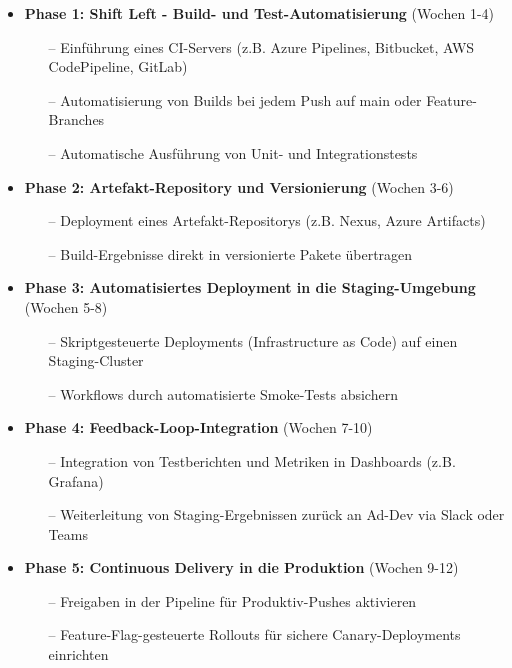 \begin{itemize}
    \item \textbf{Phase 1: Shift Left - Build- und Test-Automatisierung} (Wochen 1-4)
    \begin{itemize}
        \item[--] Einführung eines CI-Servers (z.B. Azure Pipelines, Bitbucket, AWS CodePipeline, GitLab)
        \item[--] Automatisierung von Builds bei jedem Push auf main oder Feature-Branches
        \item[--] Automatische Ausführung von Unit- und Integrationstests
    \end{itemize}

    \item \textbf{Phase 2: Artefakt-Repository und Versionierung} (Wochen 3-6)
    \begin{itemize}
        \item[--] Deployment eines Artefakt-Repositorys (z.B. Nexus, Azure Artifacts)
        \item[--] Build-Ergebnisse direkt in versionierte Pakete übertragen
    \end{itemize}

    \item \textbf{Phase 3: Automatisiertes Deployment in die Staging-Umgebung} (Wochen 5-8)
    \begin{itemize}
        \item[--] Skriptgesteuerte Deployments (Infrastructure as Code) auf einen Staging-Cluster
        \item[--] Workflows durch automatisierte Smoke-Tests absichern
    \end{itemize}

    \item \textbf{Phase 4: Feedback-Loop-Integration} (Wochen 7-10)
    \begin{itemize}
        \item[--] Integration von Testberichten und Metriken in Dashboards (z.B. Grafana)
        \item[--] Weiterleitung von Staging-Ergebnissen zurück an Ad-Dev via Slack oder Teams
    \end{itemize}

    \item \textbf{Phase 5: Continuous Delivery in die Produktion} (Wochen 9-12)
    \begin{itemize}
        \item[--] Freigaben in der Pipeline für Produktiv-Pushes aktivieren
        \item[--] Feature-Flag-gesteuerte Rollouts für sichere Canary-Deployments einrichten
    \end{itemize}
\end{itemize}

